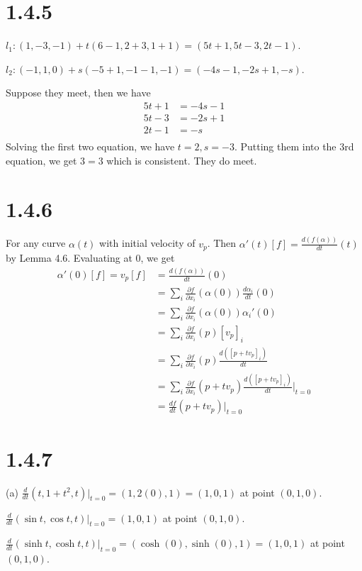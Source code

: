\documentclass[12pt]{article}
\begin{document}
\section*{1.4.5}
$l_1: (1, -3, -1) + t(6-1, 2+3, 1+1) = (5t+1, 5t-3, 2t-1)$.

$l_2: (-1, 1, 0) + s(-5+1, -1 - 1, -1) = (-4s-1, -2s+1, -s)$.

Suppose they meet, then we have 
\begin{align}
	5t + 1 &= -4s - 1 \\
	5t - 3 &= -2s + 1 \\
	2t - 1 &= -s \\
\end{align}
Solving the first two equation, we have $t=2, s= -3$. Putting them into the 3rd equation, we get $3 = 3$ which is consistent. They do meet.

\section*{1.4.6}
For any curve $\alpha(t)$ with initial velocity of $v_p$. Then $\alpha'(t)[f] = \frac{d(f(\alpha))}{dt} (t)$ by Lemma 4.6. Evaluating at 0, we get $$\begin{aligned}
	\alpha'(0)[f] = v_p [f] &= \frac{d(f(\alpha))}{dt}(0) \\
	   &= \sum_i \frac{\partial f}{\partial x_i}(\alpha(0)) \frac{d \alpha_i}{dt}(0) \\
	   &= \sum_i \frac{\partial f}{\partial x_i}(\alpha(0)) \alpha_i'(0) \\
	   &= \sum_i \frac{\partial f}{\partial x_i}(p)[v_p]_i \\
	   &= \sum_i \frac{\partial f}{\partial x_i}(p)\frac{d([p+tv_p]_i)}{dt} \\ 
	   &= \sum_i \frac{\partial f}{\partial x_i}(p+ tv_p)\frac{d([p+tv_p]_i)}{dt} \bigg|_{t=0} \\
	   &= \frac{df}{dt}(p + tv_p) \bigg|_{t=0}
\end{aligned}$$
\section*{1.4.7}
(a) $\frac{d}{dt}(t, 1 + t^2, t)\bigg|_{t=0} =(1, 2(0), 1) = (1, 0, 1)$ at point $(0, 1, 0)$.

$\frac{d}{dt}(\sin t, \cos t, t)\bigg|_{t=0} = (1, 0, 1)$ at point $(0, 1, 0)$.

$\frac{d}{dt}(\sinh t, \cosh t, t) \bigg|_{t=0} = (\cosh(0), \sinh(0), 1) = (1, 0, 1)$ at point $(0, 1, 0)$.
\end{document}
